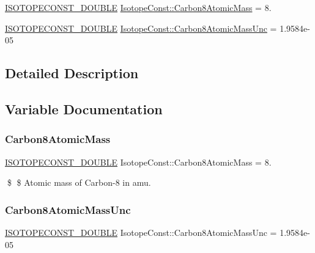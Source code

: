 \begin{DoxyCompactItemize}
\item 
\mbox{\hyperlink{group___isotope_const-_macros_ga8f45a7272ce02c0b4c65c44636ed719a}{I\+S\+O\+T\+O\+P\+E\+C\+O\+N\+S\+T\+\_\+\+D\+O\+U\+B\+LE}} \mbox{\hyperlink{group___isotope_const-_carbon-_c8_ga2f6acae94dc09b05704a7277710c0ae2}{Isotope\+Const\+::\+Carbon8\+Atomic\+Mass}} = 8.
\item 
\mbox{\hyperlink{group___isotope_const-_macros_ga8f45a7272ce02c0b4c65c44636ed719a}{I\+S\+O\+T\+O\+P\+E\+C\+O\+N\+S\+T\+\_\+\+D\+O\+U\+B\+LE}} \mbox{\hyperlink{group___isotope_const-_carbon-_c8_ga1bab5dfea2e09165223e094212a75665}{Isotope\+Const\+::\+Carbon8\+Atomic\+Mass\+Unc}} = 1.\+9584e-\/05
\end{DoxyCompactItemize}


\subsection{Detailed Description}


\subsection{Variable Documentation}
\mbox{\label{group___isotope_const-_carbon-_c8_ga2f6acae94dc09b05704a7277710c0ae2}} 
\subsubsection{\texorpdfstring{Carbon8\+Atomic\+Mass}{Carbon8AtomicMass}}
{\footnotesize\ttfamily \mbox{\hyperlink{group___isotope_const-_macros_ga8f45a7272ce02c0b4c65c44636ed719a}{I\+S\+O\+T\+O\+P\+E\+C\+O\+N\+S\+T\+\_\+\+D\+O\+U\+B\+LE}} Isotope\+Const\+::\+Carbon8\+Atomic\+Mass = 8.}

\$ \$ Atomic mass of Carbon-\/8 in amu. \mbox{\label{group___isotope_const-_carbon-_c8_ga1bab5dfea2e09165223e094212a75665}} 
\subsubsection{\texorpdfstring{Carbon8\+Atomic\+Mass\+Unc}{Carbon8AtomicMassUnc}}
{\footnotesize\ttfamily \mbox{\hyperlink{group___isotope_const-_macros_ga8f45a7272ce02c0b4c65c44636ed719a}{I\+S\+O\+T\+O\+P\+E\+C\+O\+N\+S\+T\+\_\+\+D\+O\+U\+B\+LE}} Isotope\+Const\+::\+Carbon8\+Atomic\+Mass\+Unc = 1.\+9584e-\/05}


